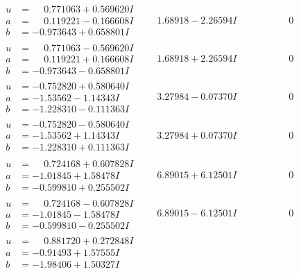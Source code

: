 \documentclass[1p]{elsarticle_modified}
\theoremstyle{definition}
\begin{document}
$$\begin{array}{c|c|c}
\begin{aligned}
u &= \phantom{-}0.771063 + 0.569620 I \\
a &= \phantom{-}0.119221 - 0.166608 I \\
b &= -0.973643 + 0.658801 I\end{aligned}
 & \phantom{-}1.68918 - 2.26594 I & \phantom{-0.000000 } 0 \\ \hline\begin{aligned}
u &= \phantom{-}0.771063 - 0.569620 I \\
a &= \phantom{-}0.119221 + 0.166608 I \\
b &= -0.973643 - 0.658801 I\end{aligned}
 & \phantom{-}1.68918 + 2.26594 I & \phantom{-0.000000 } 0 \\ \hline\begin{aligned}
u &= -0.752820 + 0.580640 I \\
a &= -1.53562 - 1.14343 I \\
b &= -1.228310 - 0.111363 I\end{aligned}
 & \phantom{-}3.27984 - 0.07370 I & \phantom{-0.000000 } 0 \\ \hline\begin{aligned}
u &= -0.752820 - 0.580640 I \\
a &= -1.53562 + 1.14343 I \\
b &= -1.228310 + 0.111363 I\end{aligned}
 & \phantom{-}3.27984 + 0.07370 I & \phantom{-0.000000 } 0 \\ \hline\begin{aligned}
u &= \phantom{-}0.724168 + 0.607828 I \\
a &= -1.01845 + 1.58478 I \\
b &= -0.599810 + 0.255502 I\end{aligned}
 & \phantom{-}6.89015 + 6.12501 I & \phantom{-0.000000 } 0 \\ \hline\begin{aligned}
u &= \phantom{-}0.724168 - 0.607828 I \\
a &= -1.01845 - 1.58478 I \\
b &= -0.599810 - 0.255502 I\end{aligned}
 & \phantom{-}6.89015 - 6.12501 I & \phantom{-0.000000 } 0 \\ \hline\begin{aligned}
u &= \phantom{-}0.881720 + 0.272848 I \\
a &= -0.91493 + 1.57555 I \\
b &= -1.98406 + 1.50327 I\end{aligned}

\end{array}$$
\end{document}
